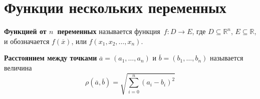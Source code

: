 \section{Функции нескольких переменных}
 \textbf{Функцией от $n$~переменных} называется функция~$f \colon D \to E$, где $D \subseteq \mathbb R^n$, $E \subseteq \mathbb R$, и обозначается $f(\overline x)$, или $f(x_1, x_2, \ldots, x_n)$.

  \textbf{Расстоянием между точками} $\overline a = (a_1, \ldots, a_n)$ и $\overline b = (b_1, \ldots, b_n)$ называется величина
\begin{equation*}
\rho(\overline a, \overline b) = \sqrt{\sum_{i=0}^n (a_i - b_i)^2}
\end{equation*}